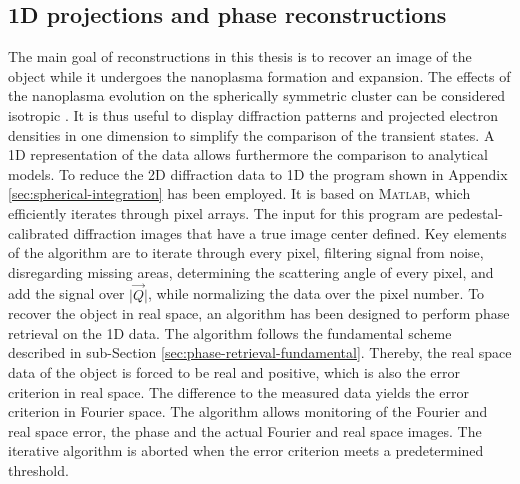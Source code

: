 \subsection{1D projections and phase reconstructions}\label{sec:1d-proj-and-phase-reconstruction}
The main goal of reconstructions in this thesis is to recover an image of the object while it undergoes the nanoplasma formation and expansion. The effects of the nanoplasma evolution on the spherically symmetric cluster can be considered isotropic \citep{Gorkhover-2016-NatPho}. It is thus useful to display diffraction patterns and projected electron densities in one dimension to simplify the comparison of the transient states. A 1D representation of the data allows furthermore the comparison to analytical models. To reduce the 2D diffraction data to 1D the program shown in Appendix \ref{sec:spherical-integration} has been employed. It is based on \textsc{Matlab}, which efficiently iterates through pixel arrays. The input for this program are pedestal-calibrated diffraction images that have a true image center defined. Key elements of the algorithm are to iterate through every pixel, filtering signal from noise, disregarding missing areas, determining the scattering angle of every pixel, and add the signal over $\lvert \vec{Q}\rvert$, while normalizing the data over the pixel number. To recover the object in real space, an algorithm has been designed to perform phase retrieval on the 1D data.
The algorithm follows the fundamental scheme described in sub-Section \ref{sec:phase-retrieval-fundamental}. Thereby, the real space data of the object is forced to be real and positive, which is also the error criterion in real space. The difference to the measured data yields the error criterion in Fourier space. The algorithm allows monitoring of the Fourier and real space error, the phase and the actual Fourier and real space images. The iterative algorithm is aborted when the error criterion meets a predetermined threshold.
%
%
%
